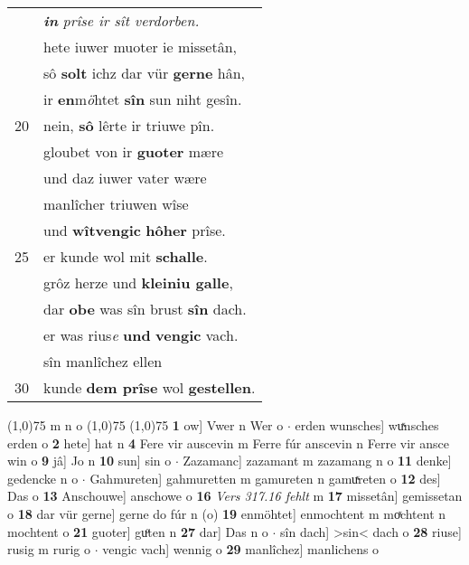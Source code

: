 \documentclass[8pt,a4paper,notitlepage]{article}
\begin{document}
\begin{table}[ht]
\begin{minipage}[t]{0.5\linewidth}
\begin{tabular}{rl}
 & \textit{\textbf{in}} \textit{prîse ir sît verdorben.}\\ 
 & hete iuwer muoter ie missetân,\\ 
 & sô \textbf{solt} ichz dar vür \textbf{gerne} hân,\\ 
 & ir \textbf{en}m\textit{ö}htet \textbf{sîn} sun niht gesîn.\\ 
20 & nein, \textbf{sô} lêrte ir triuwe pîn.\\ 
 & gloubet von ir \textbf{guoter} mære\\ 
 & und daz iuwer vater wære\\ 
 & manlîcher triuwen wîse\\ 
 & und \textbf{wîtvengic} \textbf{hôher} prîse.\\ 
25 & er kunde wol mit \textbf{schalle}.\\ 
 & grôz herze und \textbf{kleiniu galle},\\ 
 & dar \textbf{obe} was sîn brust \textbf{sîn} dach.\\ 
 & er was rius\textit{e} \textbf{und} \textbf{vengic} vach.\\ 
 & sîn manlîchez ellen\\ 
30 & kunde \textbf{dem prîse} wol \textbf{gestellen}.\\ 
\end{tabular}
\scriptsize
\line(1,0){75} \newline
m n o \newline
\line(1,0){75} \newline
\newline
\line(1,0){75} \newline
\textbf{1} ow] Vwer n Wer o  $\cdot$ erden wunsches] wuͯnsches erden o \textbf{2} hete] hat n \textbf{4} Fere vir auscevin m Ferre fúr anscevin n Ferre vir ansce win o \textbf{9} jâ] Jo n \textbf{10} sun] sin o  $\cdot$ Zazamanc] zazamant m zazamang n o \textbf{11} denke] gedencke n o  $\cdot$ Gahmureten] gahmuretten m gamureten n gamuͯreten o \textbf{12} des] Das o \textbf{13} Anschouwe] anschowe o \textbf{16} \textit{Vers 317.16 fehlt} m  \textbf{17} missetân] gemissetan o \textbf{18} dar vür gerne] gerne do fúr n (o) \textbf{19} enmöhtet] enmochtent m moͯchtent n mochtent o \textbf{21} guoter] guͦten n \textbf{27} dar] Das n o  $\cdot$ sîn dach] >sin< dach o \textbf{28} riuse] rusig m rurig o  $\cdot$ vengic vach] wennig o \textbf{29} manlîchez] manlichens o \newline
\end{minipage}
\end{table}
\newpage
\end{document}
